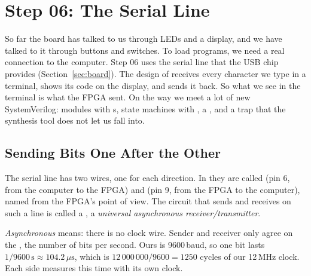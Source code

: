 \chapter{Step 06: The Serial Line}
\label{ch:step06}


So far the board has talked to us through LEDs and a display, and we have
talked to it through buttons and switches. To load programs, we need a real
connection to the computer. Step 06 uses the serial line that the USB chip
provides (Section~\ref{sec:board}). The design of  receives
every character we type in a terminal, shows its code on the display, and
sends it back. So what we see in the terminal is what the FPGA sent. On the
way we meet a lot of new SystemVerilog: modules with s, state
machines with , a , and a trap that the
synthesis tool does not let us fall into.

\section{Sending Bits One After the Other}
\label{sec:step06-uart}

The serial line has two wires, one for each direction. In
 they are called  (pin 6, from the computer to the
FPGA) and  (pin 9, from the FPGA to the computer), named from the
FPGA's point of view. The circuit that sends and receives on such a line is
called a , a \emph{universal asynchronous receiver/transmitter}.

\emph{Asynchronous} means: there is no clock wire. Sender and receiver only
agree on the , the number of bits per second. Ours is
9600\,baud, so one bit lasts $1/9600\,\mathrm{s} \approx 104.2\,\mu\mathrm{s}$,
which is $12\,000\,000 / 9600 = 1250$ cycles of our 12\,MHz clock. Each side
measures this time with its own clock.

